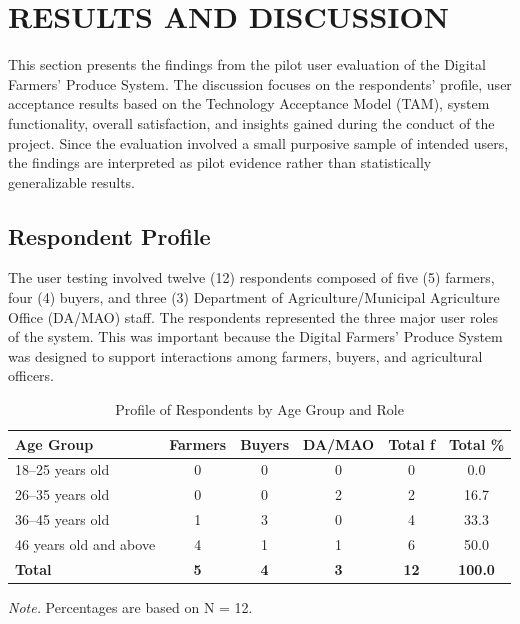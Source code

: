 
\section{RESULTS AND DISCUSSION}

This section presents the findings from the pilot user evaluation of the Digital Farmers' Produce System. The discussion focuses on the respondents' profile, user acceptance results based on the Technology Acceptance Model (TAM), system functionality, overall satisfaction, and insights gained during the conduct of the project. Since the evaluation involved a small purposive sample of intended users, the findings are interpreted as pilot evidence rather than statistically generalizable results.

\subsection{Respondent Profile}

The user testing involved twelve (12) respondents composed of five (5) farmers, four (4) buyers, and three (3) Department of Agriculture/Municipal Agriculture Office (DA/MAO) staff. The respondents represented the three major user roles of the system. This was important because the Digital Farmers' Produce System was designed to support interactions among farmers, buyers, and agricultural officers.

\begin{table}[htbp]
\vspace{2ex}
\centering
\caption{Profile of Respondents by Age Group and Role}
\label{table:respondent-age-role}
\begin{tabular}{p{3.2cm}ccccc}
\hline
\hline
\textbf{Age Group} & \textbf{Farmers} & \textbf{Buyers} & \textbf{DA/MAO} & \textbf{Total f} & \textbf{Total \%} \\
\hline
18--25 years old & 0 & 0 & 0 & 0 & 0.0 \\
26--35 years old & 0 & 0 & 2 & 2 & 16.7 \\
36--45 years old & 1 & 3 & 0 & 4 & 33.3 \\
46 years old and above & 4 & 1 & 1 & 6 & 50.0 \\
\hline
\textbf{Total} & \textbf{5} & \textbf{4} & \textbf{3} & \textbf{12} & \textbf{100.0} \\
\hline
\hline
\end{tabular}
\vspace{1ex}

\begin{flushleft}
\footnotesize{\textit{Note.} Percentages are based on N = 12.}
\end{flushleft}
\vspace{2ex}
\end{table}

